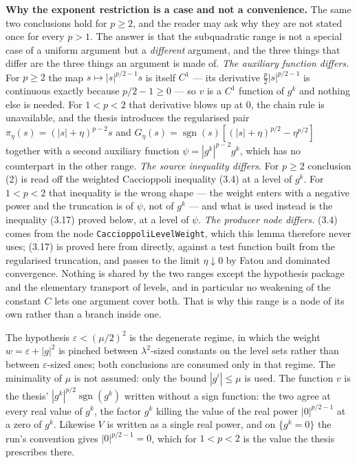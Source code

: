 \begin{lemma}
\medskip
\noindent\textbf{Why the exponent restriction is a case and not a convenience.}
The same two conclusions hold for $p\ge2$, and the reader may ask why they are
not stated once for every $p>1$.  The answer is that the subquadratic range is
not a special case of a uniform argument but a \emph{different} argument, and
the three things that differ are the three things an argument is made of.
\emph{The auxiliary function differs.}  For $p\ge2$ the map
$s\mapsto|s|^{p/2-1}s$ is itself $C^1$ --- its derivative $\tfrac
p2|s|^{p/2-1}$ is continuous exactly because $p/2-1\ge0$ --- so $v$ is a $C^1$
function of $g^k$ and nothing else is needed.  For $1<p<2$ that derivative blows
up at $0$, the chain rule is unavailable, and the thesis introduces the
regularised pair $\pi_\eta(s)=(|s|+\eta)^{p-2}s$ and
$G_\eta(s)=\operatorname{sgn}(s)[(|s|+\eta)^{p/2}-\eta^{p/2}]$ together with a
second auxiliary function $\psi=|g^k|^{p-2}g^k$, which has no counterpart in the
other range.  \emph{The source inequality differs.}  For $p\ge2$ conclusion (2)
is read off the weighted Caccioppoli inequality (3.4) at a level of $g^k$.  For
$1<p<2$ that inequality is the wrong shape --- the weight enters with a negative
power and the truncation is of $\psi$, not of $g^k$ --- and what is used instead
is the inequality (3.17) proved below, at a level of $\psi$.  \emph{The producer
node differs.}  (3.4) comes from the node \texttt{CaccioppoliLevelWeight},
which this lemma therefore never uses; (3.17) is proved here from
 directly, against a test
function built from the regularised truncation, and passes to the limit
$\eta\downarrow0$ by Fatou and dominated convergence.  Nothing is shared by the
two ranges except the hypothesis package and the elementary transport of levels,
and in particular no weakening of the constant $C$ lets one argument cover both.
That is why this range is a node of its own rather than a branch inside one.

\medskip
The hypothesis $\varepsilon<(\mu/2)^2$ is the degenerate regime, in which the
weight $w=\varepsilon+|g|^2$ is pinched between $\lambda^2$-sized constants on
the level sets rather than between $\varepsilon$-sized ones; both conclusions
are consumed only in that regime.  The minimality of $\mu$ is not assumed: only
the bound $|g^i|\le\mu$ is used.  The function $v$ is the thesis'
$|g^k|^{p/2}\operatorname{sgn}(g^k)$ written without a sign function: the two
agree at every real value of $g^k$, the factor $g^k$ killing the value of the
real power $|0|^{p/2-1}$ at a zero of $g^k$.  Likewise $V$ is written as a
single real power, and on $\{g^k=0\}$ the run's convention gives
$|0|^{p/2-1}=0$, which for $1<p<2$ is the value the thesis prescribes there.
\end{lemma}
